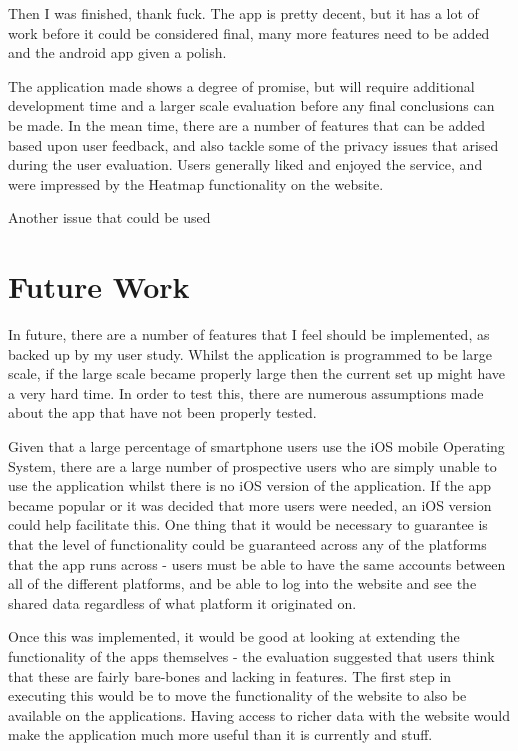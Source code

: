 \documentclass{l4proj}
\begin{document}
Then I was finished, thank fuck. The app is pretty decent, but it has a lot of work before it could be considered final, many more features need to be added and the android app given a polish.

The application made shows a degree of promise, but will require additional development time and a larger scale evaluation before any final conclusions can be made. In the mean time, there are a number of features that can be added based upon user feedback, and also tackle some of the privacy issues that arised during the user evaluation. Users generally liked and enjoyed the service, and were impressed by the Heatmap functionality on the website. 

Another issue that could be used 

\section{Future Work}

In future, there are a number of features that I feel should be implemented, as backed up by my user study. Whilst the application is programmed to be large scale, if the large scale became properly large then the current set up might have a very hard time. In order to test this, there are numerous assumptions made about the app that have not been properly tested.

Given that a large percentage of smartphone users use the iOS mobile Operating System, there are a large number of prospective users who are simply unable to use the application whilst there is no iOS version of the application. If the app became popular or it was decided that more users were needed, an iOS version could help facilitate this. One thing that it would be necessary to guarantee is that the level of functionality could be guaranteed across any of the platforms that the app runs across - users must be able to have the same accounts between all of the different platforms, and be able to log into the website and see the shared data regardless of what platform it originated on.

Once this was implemented, it would be good at looking at extending the functionality of the apps themselves - the evaluation suggested that users think that these are fairly bare-bones and lacking in features. The first step in executing this would be to move the functionality of the website to also be available on the applications. Having access to richer data with the website would make the application much more useful than it is currently and stuff.
\end{document}
